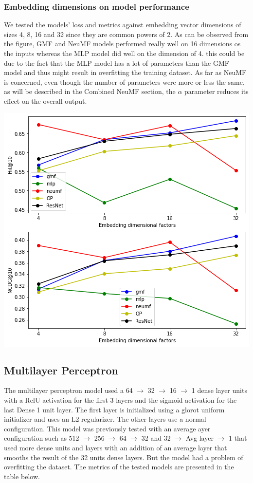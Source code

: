 \documentclass{article}
\begin{document}
\subsubsection{Embedding dimensions on model performance}
We tested the models' loss and metrics against embedding vector dimensions of sizes 4, 8, 16 and 32 since they are common powers of 2. As can be observed from the figure, GMF and NeuMF models performed really well on 16 dimensions os the inputs whereas the MLP model did well on the dimension of 4. this could be due to the fact that the MLP model has a lot of parameters than the GMF model and thus might result in overfitting the training dataset. As far as NeuMF is concerned, even though the number of parameters were more or less the same, as will be described in the Combined NeuMF section, the $\alpha$ parameter reduces its effect on the overall output.
\begin{center}
\includegraphics[scale=0.5]{factors}
\end{center}

\subsection{Multilayer Perceptron}
The multilayer perceptron model used a 64 $\rightarrow$ 32 $\rightarrow$ 16 $\rightarrow$ 1 dense layer units with a RelU activation for the first 3 layers and the sigmoid activation for the last Dense 1 unit layer. The first layer is initialized using a glorot uniform initializer and uses an L2 regularizer. The other layers use a normal configuration. This model was previously tested with an average ayer configuration such as 512 $\rightarrow$ 256 $\rightarrow$ 64 $\rightarrow$ 32 and 32 $\rightarrow$ Avg layer $\rightarrow$ 1 that used more dense units and layers with an addition of an average layer that smooths the result of the 32 units dense layers. But the model had a problem of overfitting the dataset. The metrics of the tested models are presented in the table below.
\end{document}
